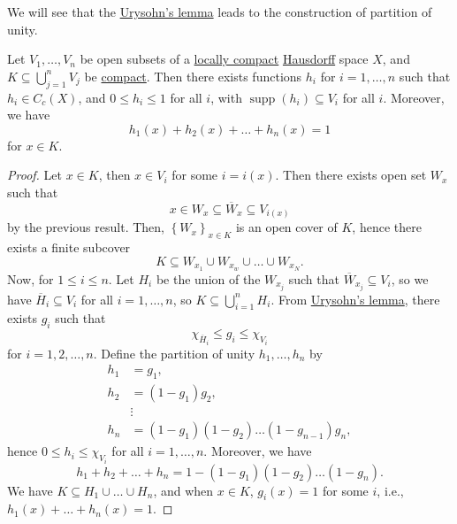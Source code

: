 We will see that the \hyperref[thm:Urysohn-lemma]{Urysohn's lemma} leads to the construction of partition of unity.

\begin{theorem}
	Let \(V_1, \ldots , V_n\) be open subsets of a \hyperref[def:locally-compact]{locally compact} \hyperref[def:Hausdorff]{Hausdorff} space \(X\), and \(K \subseteq \bigcup_{j=1}^{n} V_j\) be \hyperref[def:compact]{compact}. Then there exists functions \(h_i\) for \(i = 1, \ldots  , n\) such that \(h_i \in C_c(X)\), and \(0 \leq h_i \leq 1\) for all \(i\), with \(\mathop{\mathrm{supp}}(h_i) \subseteq V_i\) for all \(i\). Moreover, we have
	\[
		h_1 (x) + h_2(x) + \ldots  + h_n(x) = 1
	\]
	for \(x\in K\).
\end{theorem}
\begin{proof}
	Let \(x\in K\), then \(x\in V_i\) for some \(i = i(x)\). Then there exists open set \(W_x\) such that
	\[
		x\in W_x \subseteq \overline{W} _x \subseteq V_{i(x)}
	\]
	by the previous result. Then, \(\left\{ W_x \right\} _{x\in K}\) is an open cover of \(K\), hence there exists a finite subcover
	\[
		K \subseteq W_{x_1} \cup W_{x_w} \cup \ldots \cup W_{x_N}.
	\]
	Now, for \(1 \leq i \leq n\). Let \(H_i\) be the union of the \(W_{x_j}\) such that \(\overline{W} _{x_j} \subseteq V_i\), so we have \(\overline{H} _i \subseteq V_i\) for all \(i = 1, \ldots  , n\), so \(K \subseteq \bigcup_{i=1}^{n} H_i\). From \hyperref[thm:Urysohn-lemma]{Urysohn's lemma}, there exists \(g_i\) such that
	\[
		\chi _{\overline{H} _i} \leq g_i \leq \chi _{V_i}
	\]
	for \(i = 1, 2, \ldots  , n\). Define the partition of unity \(h_1, \ldots, h_n\) by
	\[
		\begin{split}
			h_1 &= g_1, \\
			h_2 &= (1-g_1)g_2, \\
			&\vdots \\
			h_n &= (1-g_1)(1-g_2) \ldots  (1-g_{n-1}) g_n,
		\end{split}
	\]
	hence \(0 \leq h_i \leq \chi _{V_i}\) for all \(i = 1, \ldots  , n\). Moreover, we have
	\[
		h_1 + h_2 + \ldots  + h_n = 1 - (1-g_1)(1-g_2)\ldots  (1-g_n).
	\]
	We have \(K \subseteq H_1 \cup \ldots  \cup H_n\), and when \(x\in K\), \(g_i(x) = 1\) for some \(i\), i.e., \(h_1 (x) + \ldots  + h_n(x) = 1\).
\end{proof}

